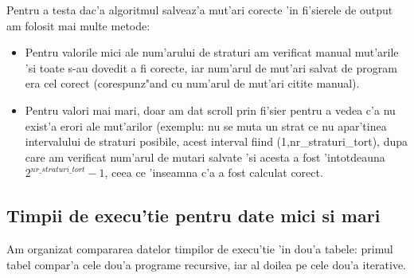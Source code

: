 \documentclass{article}
\begin{document}
Pentru a testa dac'a algoritmul salveaz'a mut'ari corecte 'in fi'sierele de output am folosit mai multe metode:
\begin{itemize}
    \item Pentru valorile mici ale num'arului de straturi am verificat manual mut'arile 'si toate s-au dovedit a fi corecte, iar num'arul de mut'ari salvat de program era cel corect (corespunz"and cu num'arul de mut'ari citite manual).
    \item Pentru valori mai mari, doar am dat scroll prin fi'sier pentru a vedea c'a nu exist'a erori ale mut'arilor (exemplu: nu se muta un strat ce nu apar'tinea intervalului de straturi posibile, acest interval fiind (1,nr\_straturi\_tort), dupa care am verificat num'arul de mutari salvate 'si acesta a fost 'intotdeauna \\
    $2^{nr\_straturi\_tort}-1$, ceea ce 'inseamna c'a a fost calculat corect.
    
    
\end{itemize}


\subsection{Timpii de execu'tie pentru date mici si mari}

Am organizat compararea datelor timpilor de execu'tie 'in dou'a tabele: primul tabel compar'a cele dou'a programe recursive, iar al doilea pe cele dou'a iterative.
\end{document}
